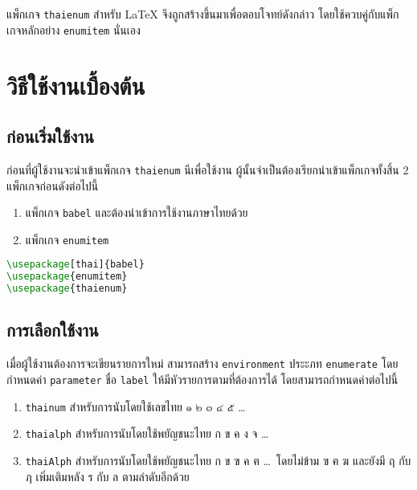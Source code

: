 \documentclass[11pt]{ltxguide}
\begin{document}
แพ็ก{\wbr}เก{\wbr}จ \textlatin{\texttt{thaienum}} สำหรับ \textlatin{\textrm\LaTeX} จึง{\wbr}ถูก{\wbr}สร้าง{\wbr}ขึ้น{\wbr}มา{\wbr}เพื่อ{\wbr}ตอบ{\wbr}โจทย์{\wbr}ดัง{\wbr}กล่าว โดย{\wbr}ใช้{\wbr}ควบคู่{\wbr}กับ{\wbr}แพ็ก{\wbr}เก{\wbr}จ{\wbr}หลัก{\wbr}อย่าง \texttt{enumitem} นั่นเอง{\wbr}


\section{วิธี{\wbr}ใช้งาน{\wbr}เบื้องต้น}

\subsection{ก่อน{\wbr}เริ่ม{\wbr}ใช้งาน}

ก่อน{\wbr}ที่{\wbr}ผู้{\wbr}ใช้งาน{\wbr}จะ{\wbr}นำ{\wbr}เข้า{\wbr}แพ็ก{\wbr}เก{\wbr}จ \texttt{thaienum} นีเพื่อ{\wbr}ใช้งาน ผู้{\wbr}นั้น{\wbr}จำเป็น{\wbr}ต้อง{\wbr}เรียก{\wbr}นำ{\wbr}เข้า{\wbr}แพ็ก{\wbr}เก{\wbr}จ{\wbr}ทั้งสิ้น 2 แพ็ก{\wbr}เก{\wbr}จ{\wbr}ก่อน{\wbr}ดัง{\wbr}ต่อ{\wbr}ไป{\wbr}นี้{\wbr}
\begin{enumerate}[topsep=0.25pc,itemsep=0pc,label={\thainum*.}]
    \item  แพ็ก{\wbr}เก{\wbr}จ \texttt{babel} และ{\wbr}ต้อง{\wbr}นำ{\wbr}เข้า{\wbr}การ{\wbr}ใช้งาน{\wbr}ภาษา{\wbr}ไทย{\wbr}ด้วย{\wbr}
    \item  แพ็ก{\wbr}เก{\wbr}จ \texttt{enumitem}
\end{enumerate}

\begin{lstlisting}[language=LaTeX]
\usepackage[thai]{babel}
\usepackage{enumitem}
\usepackage{thaienum}
\end{lstlisting}

\subsection{การ{\wbr}เลือก{\wbr}ใช้งาน}

เมื่อ{\wbr}ผู้{\wbr}ใช้งาน{\wbr}ต้องการ{\wbr}จะ{\wbr}เขียน{\wbr}รายการ{\wbr}ใหม่ สามารถ{\wbr}สร้าง \texttt{environment} ประะภท \texttt{enumerate} โดย{\wbr}กำหนด{\wbr}ค่า \texttt{parameter} ชื่อ \texttt{label} ให้{\wbr}มี{\wbr}หัว{\wbr}รายการ{\wbr}ตาม{\wbr}ที่{\wbr}ต้องการ{\wbr}ได้ โดย{\wbr}สามารถ{\wbr}กำหนด{\wbr}ค่า{\wbr}ต่อ{\wbr}ไป{\wbr}นี้{\wbr}

\begin{enumerate}[topsep=0.25pc,itemsep=0pc,label={\thainum*.}]
    \item  \texttt{thainum} สำหรับ{\wbr}การ{\wbr}นับ{\wbr}โดย{\wbr}ใช้{\wbr}เลข{\wbr}ไทย ๑ ๒ ๓ ๔ ๕ \ldots
    \item  \label{it:loalph} \texttt{thaialph} สำหรับ{\wbr}การ{\wbr}นับ{\wbr}โดย{\wbr}ใช้{\wbr}พยัญชนะ{\wbr}ไทย ก ข ค ง จ \ldots
    \item  \label{it:hialph} \texttt{thaiAlph} สำหรับ{\wbr}การ{\wbr}นับ{\wbr}โดย{\wbr}ใช้{\wbr}พยัญชนะ{\wbr}ไทย ก ข ฃ ค ฅ \ldots\, โดย{\wbr}ไม่{\wbr}ข้าม ฃ ฅ ฆ และ{\wbr}ยัง{\wbr}มี ฤ กับ ฦ เพิ่มเติม{\wbr}หลัง ร กับ ล ตาม{\wbr}ลำดับ{\wbr}อีก{\wbr}ด้วย{\wbr}
\end{enumerate}
\end{document}
